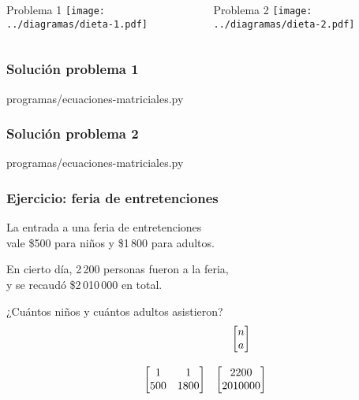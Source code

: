\documentclass[12pt]{beamer}
\begin{document}
  \begin{frame}
    \label{diagramas-dieta}
    \begin{columns}
        \begin{block}{Problema 1}
          \vspace{2ex}
          \texttt{[image: ../diagramas/dieta-1.pdf]}
        \end{block}
        \begin{block}{Problema 2}
          \vspace{2ex}
          \texttt{[image: ../diagramas/dieta-2.pdf]}
        \end{block}
    \end{columns}
  \end{frame}

  \begin{frame}
    \label{solucion-nutrientes}
    \frametitle{Solución problema 1}
    
        {programas/ecuaciones-matriciales.py}
  \end{frame}

  \begin{frame}
    \label{solucion-alimentos}
    \frametitle{Solución problema 2}
    
        {programas/ecuaciones-matriciales.py}
  \end{frame}

  \begin{frame}
    \label{enunciado-feria}
    \frametitle{Ejercicio: feria de entretenciones}
    La entrada a una feria de entretenciones \\
    vale \$500 para niños y \$1\,800 para adultos.
    \vspace{2ex}

    En cierto día,
    2\,200 personas fueron a la feria, \\
    y se recaudó \$2\,010\,000 en total.
    \vspace{2ex}

    ¿Cuántos niños y cuántos adultos asistieron?
    \pause
    \[
      \begin{array}{cc}
        &
        \begin{bmatrix} n \\ a \\ \end{bmatrix} \vspace{3ex} \\
        \begin{bmatrix} 1 & 1 \\ 500 & 1800 \\ \end{bmatrix} &
        \begin{bmatrix} 2200  \\ 2010000    \\ \end{bmatrix}
      \end{array}
    \]
  \end{frame}
\end{document}

